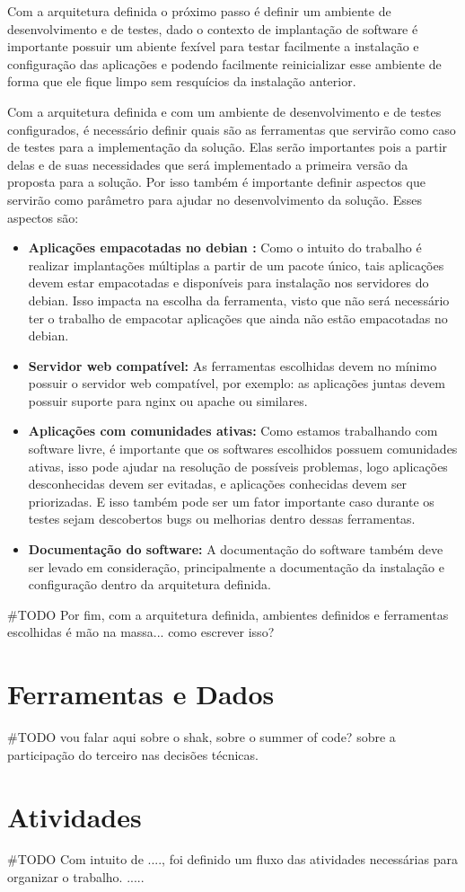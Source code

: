 Com a arquitetura definida o próximo passo é definir um ambiente de desenvolvimento e de
testes, dado o contexto de implantação de software é importante possuir um abiente fexível para
testar facilmente a instalação e configuração das aplicações e podendo facilmente
reinicializar esse ambiente de forma que ele fique limpo sem resquícios da instalação
anterior.

Com a arquitetura definida e com um ambiente de desenvolvimento e de testes configurados, é
necessário definir quais são as ferramentas que servirão como caso de testes
para a implementação da solução. Elas serão importantes pois a partir delas
e de suas necessidades que será implementado a primeira versão da proposta para
a solução. Por isso também é importante definir aspectos que servirão como parâmetro
para ajudar no desenvolvimento da solução. Esses aspectos são:

\begin{itemize}
  \item  \textbf{Aplicações empacotadas no debian :}  Como o intuito do trabalho
  é realizar implantações múltiplas a partir de um pacote único, tais aplicações
  devem estar empacotadas e disponíveis para instalação nos servidores do debian.
  Isso impacta na escolha da ferramenta, visto que não será necessário ter o trabalho
  de empacotar aplicações que ainda não estão empacotadas no debian.
  \item  \textbf{Servidor web compatível:} As ferramentas escolhidas devem no
  mínimo possuir o servidor web compatível, por exemplo: as aplicações juntas
  devem possuir suporte para nginx ou apache ou similares.
  \item  \textbf{Aplicações com comunidades ativas:} Como estamos trabalhando
  com software livre, é importante que os softwares escolhidos possuem comunidades
  ativas, isso pode ajudar na resolução de  possíveis problemas, logo aplicações
  desconhecidas devem ser evitadas, e aplicações conhecidas devem ser priorizadas.
  E isso também pode ser um fator importante caso durante os testes sejam descobertos
  bugs ou melhorias dentro dessas ferramentas.
  \item  \textbf{Documentação do software:} A documentação do software também deve
  ser levado em consideração, principalmente a documentação da instalação e configuração
  dentro da arquitetura definida.
\end{itemize}

#TODO
Por fim, com a arquitetura definida, ambientes definidos e ferramentas escolhidas
é mão na massa... como escrever isso?

\section{Ferramentas e Dados}

#TODO
vou falar aqui sobre o shak, sobre o summer of code? sobre a participação do terceiro
nas decisões técnicas.

\section{Atividades}

#TODO
Com intuito de ...., foi definido um fluxo das atividades necessárias para organizar
o trabalho. .....

%

